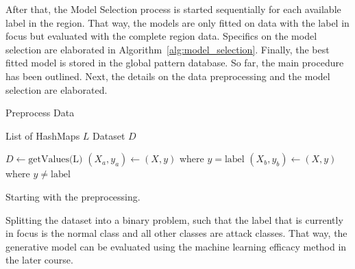  After that, the Model Selection process is started sequentially for each available label in the region. That way, the models are only fitted on data with the label in focus but evaluated with the complete region data. Specifics on the model selection are elaborated in Algorithm~\ref{alg:model_selection}. Finally, the best fitted model is stored in the global pattern database. So far, the main procedure has been outlined. Next, the details on the data preprocessing and the model selection are elaborated.

 \begin{algorithm}
    \caption{Preprocess Data}
    \label{alg:data_preprocessing}
 
    \begin{algorithmic}[1]
        \REQUIRE List of HashMaps $L$
        \ENSURE Dataset $D$
        
        \STATE $D \leftarrow \text{getValues(L)}$
                \STATE {}
                \STATE $(X_a, y_a) \leftarrow (X, y)$ where $y=\text{label}$ 
                \STATE $(X_b, y_b) \leftarrow (X, y)$ where $y \neq \text{label}$
                    \STATE {}
                \ENDIF
            \ENDIF
        \ENDFOR

    \end{algorithmic}
 \end{algorithm}

 Starting with the preprocessing.

 Splitting the dataset into a binary problem, such that the label that is currently in focus is the normal class and all other classes are attack classes. That way, the generative model can be evaluated using the machine learning efficacy method in the later course. 

